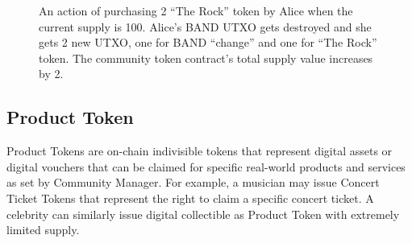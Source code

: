 \documentclass[letterpaper,11pt]{article}
\begin{document}
\begin{figure}[!h]
\centering
{}
\caption{An action of purchasing 2 ``The Rock'' token by Alice when the current supply is 100. Alice's BAND UTXO gets destroyed and she gets 2 new UTXO, one for BAND ``change'' and one for ``The Rock'' token. The community token contract's total supply value increases by 2.}
\label{fig:purchase-community-token}
\end{figure}

\subsection{Product Token} \label{sec:product-token}
Product Tokens are on-chain indivisible tokens that represent digital assets or digital vouchers that can be claimed for specific real-world products and services as set by Community Manager. For example, a musician may issue Concert Ticket Tokens that represent the right to claim a specific concert ticket. A celebrity can similarly issue digital collectible as Product Token with extremely limited supply.
\end{document}
